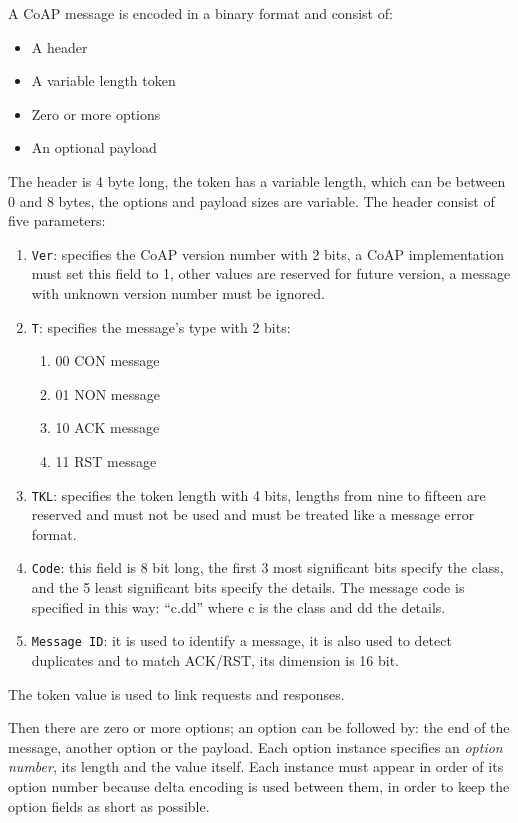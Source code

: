 	A CoAP message is encoded in a binary format and consist of:\newline
	\begin{itemize}
		\item A header
		\item A variable length token
		\item Zero or more options
		\item An optional payload
	\end{itemize}
	The header is 4 byte long, the token has a variable length, which can be between 0 and 8 bytes, the options and payload sizes are variable.\newline
	The header consist of five parameters:\newline
	\begin{enumerate}
		\item \texttt{Ver}: specifies the CoAP version number with 2 bits, a CoAP implementation must set this field to 1, other values are reserved for future version, a message with unknown version number must be ignored.
		\item \texttt{T}: specifies the message's type with 2 bits:
		\begin{enumerate}
			\item 00 CON message
			\item 01 NON message
			\item 10 ACK message
			\item 11 RST message
		\end{enumerate}
		\item \texttt{TKL}: specifies the token length with 4 bits, lengths from nine to fifteen are reserved and must not be used and must be treated like a message error format.
		\item \texttt{Code}: this field is 8 bit long, the first 3 most significant bits specify the class, and the 5 least significant bits specify the details.
		The message code is specified in this way: “c.dd” where c is the class and dd the details.
		\item \texttt{Message ID}: it is used to identify a message, it is also used to detect duplicates and to match ACK/RST, its dimension is 16 bit.
	\end{enumerate}
	
	The token value is used to link requests and responses.\newline

	Then there are zero or more options; an option can be followed by: the end of the message, another option or the payload.\newline
	Each option instance specifies an \emph{option number}, its length and the value itself.\newline
	Each instance must appear in order of its option number because delta encoding is used between them, in order to keep the option fields as short as possible.\newline
	

